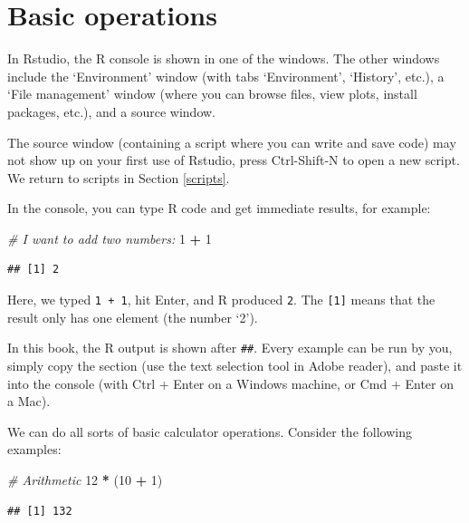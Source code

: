 \documentclass[]{book}
\newenvironment{Shaded}{\begin{snugshade}}{\end{snugshade}}
\newcommand{\CommentTok}[1]{\textcolor[rgb]{0.56,0.35,0.01}{\textit{#1}}}
\newcommand{\DecValTok}[1]{\textcolor[rgb]{0.00,0.00,0.81}{#1}}
\newcommand{\NormalTok}[1]{#1}
\newcommand{\OperatorTok}[1]{\textcolor[rgb]{0.81,0.36,0.00}{\textbf{#1}}}
\newcommand{\StringTok}[1]{\textcolor[rgb]{0.31,0.60,0.02}{#1}}
\begin{document}
\hypertarget{basicops}{%
\section{Basic operations}\label{basicops}}

In Rstudio, the R console is shown in one of the windows. The other windows include the `Environment' window (with tabs `Environment', `History', etc.), a `File management' window (where you can browse files, view plots, install packages, etc.), and a source window.

The source window (containing a script where you can write and save code) may not show up on your first use of Rstudio, press Ctrl-Shift-N to open a new script. We return to scripts in Section \ref{scripts}.

In the console, you can type R code and get immediate results, for example:

\begin{Shaded}
\begin{Highlighting}[]
\CommentTok{# I want to add two numbers:}
\DecValTok{1} \OperatorTok{+}\StringTok{ }\DecValTok{1}
\end{Highlighting}
\end{Shaded}

\begin{verbatim}
## [1] 2
\end{verbatim}

Here, we typed \texttt{1\ +\ 1}, hit Enter, and R produced \texttt{2}. The \texttt{{[}1{]}} means that the result only has one element (the number `2').

In this book, the R output is shown after \texttt{\#\#}. Every example can be run by you, simply copy the section (use the text selection tool in Adobe reader), and paste it into the console (with Ctrl + Enter on a Windows machine, or Cmd + Enter on a Mac).

We can do all sorts of basic calculator operations. Consider the following examples:

\begin{Shaded}
\begin{Highlighting}[]
\CommentTok{# Arithmetic}
\DecValTok{12} \OperatorTok{*}\StringTok{ }\NormalTok{(}\DecValTok{10} \OperatorTok{+}\StringTok{ }\DecValTok{1}\NormalTok{)}
\end{Highlighting}
\end{Shaded}

\begin{verbatim}
## [1] 132
\end{verbatim}
\end{document}
